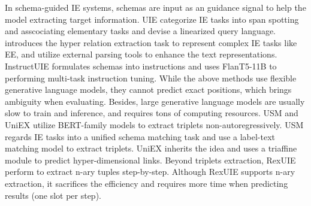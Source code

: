 In schema-guided IE systems, schemas are input as an guidance signal to help the model extracting target information.
UIE \cite{uie} categorize IE tasks into span spotting and asscociating elementary tasks and devise a linearized query language.
\citet{lasuie} introduces the hyper relation extraction task to represent complex IE tasks like EE, and utilize external parsing tools to enhance the text representations.
InstructUIE \cite{instructuie} formulates schemas into instructions and uses FlanT5-11B \cite{flan-t5} to performing multi-task instruction tuning.
While the above methods use flexible generative language models, they cannot predict exact positions, which brings ambiguity when evaluating.
Besides, large generative language models are usually slow to train and inference, and requires tons of computing resources.
USM \cite{usm} and UniEX \cite{uniex} utilize BERT-family models to extract triplets non-autoregressively.
USM regards IE tasks into a unified schema matching task and use a label-text matching model to extract triplets.
UniEX inherits the idea and uses a triaffine module to predict hyper-dimensional links.
Beyond triplets extraction, RexUIE \cite{rexuie} perform to extract n-ary tuples step-by-step.
Although RexUIE supports n-ary extraction, it sacrifices the efficiency and requires more time when predicting results (one slot per step).
